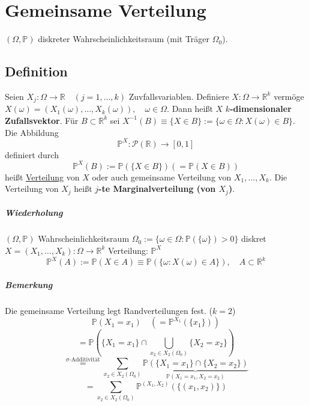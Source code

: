 \documentclass[a4paper,11pt,notitlepage]{report}
\newcommand{\R}{{\ensuremath{\mathbb{R}}}}
\newcommand{\Prim}{{\ensuremath{\mathbb{P}}}}
\begin{document}
\chapter{Gemeinsame Verteilung}
$(\Omega, \Prim)$ diskreter Wahrscheinlichkeitsraum (mit Träger $\Omega_0$).

\section{Definition}
Seien $X_j \colon \Omega \rightarrow \R \quad (j = 1, \ldots, k)$ Zuvfallsvariablen. 
Definiere $X \colon \Omega \rightarrow \R^k$ vermöge $X(\omega) = \left(X_1(\omega), \ldots, X_k(\omega)\right), \quad \omega \in \Omega$.
Dann heißt $X$ \textbf{$k$-dimensionaler Zufallsvektor}.
\newline
Für $B \subset \R^k$ sei $X^{-1}(B) \equiv \{X \in B\} := \{\omega \in \Omega \colon X(\omega) \in B\}$. Die Abbildung
$$\Prim^X \colon \mathcal{P}(\R) \rightarrow [0,1]$$ definiert durch
$$\Prim^X(B):= \Prim(\{X \in B\}) (= \Prim(X \in B))$$ heißt
\underline{Verteilung} von $X$  oder auch gemeinsame Verteilung von $X_1, \ldots, X_k$.
\newline
Die Verteilung von $X_j$ heißt \textbf{$j$-te Marginalverteilung (von $X_j$)}.

\paragraph{Wiederholung}
$(\Omega, \Prim)$ Wahrscheinlichkeitsraum
\newline
$\Omega_0 := \{ \omega \in \Omega \colon \Prim(\{\omega\})>0 \}$ diskret
\newline
$X = (X_1, \ldots, X_k) \colon \Omega \rightarrow \R^k$
\newline
Verteilung: $\Prim^X$
$$\Prim^X(A) := \Prim(X \in A) \equiv \Prim(\{\omega \colon X(\omega) \in A\}), \quad A \subset \R^k$$

\paragraph{Bemerkung}
Die gemeinsame Verteilung legt Randverteilungen fest. ($k=2$)
$$\Prim(X_1 = x_1) \quad \left(=\Prim^{X_1}(\{x_1\})\right)$$
$$= \Prim\left(\{X_1 = x_1\} \cap \bigcup\limits_{x_2 \in X_2(\Omega_0)}{\{X_2 = x_2\}}\right)$$
$$\overset{\text{$\sigma$-Additivität}}{=} \sum\limits_{x_2  \in X_2(\Omega_0)}{\underbrace{\Prim(\{X_1 = x_1\} \cap \{X_2 = x_2\})}_{\Prim(X_1 = x_1, X_2 = x_2)}}$$
$$= \sum\limits_{x_2 \in X_2(\Omega_0)}{\Prim^{(X_1,X_2)}\left(\{(x_1,x_2)\}\right)}$$
\end{document}
